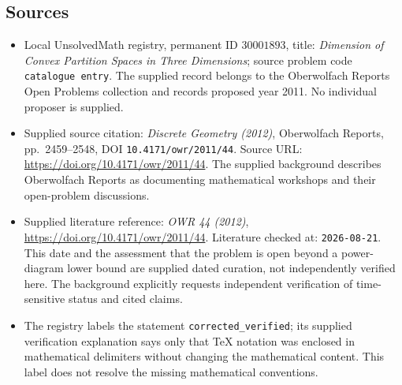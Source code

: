 \documentclass[11pt]{article}
\begin{document}
\subsection{Sources}
\begin{itemize}
\item Local UnsolvedMath registry, permanent ID \(30001893\), title: \emph{Dimension of Convex Partition Spaces in Three Dimensions}; source problem code \texttt{catalogue entry}. The supplied record belongs to the Oberwolfach Reports Open Problems collection and records proposed year 2011. No individual proposer is supplied.
\item Supplied source citation: \emph{Discrete Geometry (2012)}, Oberwolfach Reports, pp.\ 2459--2548, DOI \texttt{10.4171/owr/2011/44}. Source URL: \url{https://doi.org/10.4171/owr/2011/44}. The supplied background describes Oberwolfach Reports as documenting mathematical workshops and their open-problem discussions.
\item Supplied literature reference: \emph{OWR 44 (2012)}, \url{https://doi.org/10.4171/owr/2011/44}. Literature checked at: \texttt{2026-08-21}. This date and the assessment that the problem is open beyond a power-diagram lower bound are supplied dated curation, not independently verified here. The background explicitly requests independent verification of time-sensitive status and cited claims.
\item The registry labels the statement \texttt{corrected\_verified}; its supplied verification explanation says only that TeX notation was enclosed in mathematical delimiters without changing the mathematical content. This label does not resolve the missing mathematical conventions.
\end{itemize}
\end{document}
